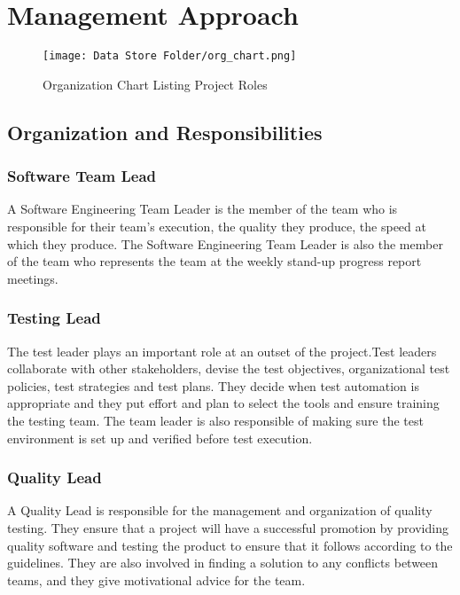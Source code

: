 \documentclass[letterpaper,12pt,oneside,listof=totoc]{scrreprt}
\begin{document}
\chapter{Management Approach} %
\begin{figure}[h!]
\centering
\texttt{[image: Data Store Folder/org\_chart.png]}
\caption{Organization Chart Listing Project Roles}
\end{figure}

\section{Organization and Responsibilities} %
    \subsection{Software Team Lead} 
    A Software Engineering Team Leader is the member of the team who is responsible for their team’s execution, the quality they produce, the speed at which they produce. The Software Engineering Team Leader is also the member of the team who represents the team at the weekly stand-up progress report meetings.
    
    \subsection{Testing Lead} 
    The test leader plays an important role at an outset of the project.Test leaders collaborate with other stakeholders, devise the test objectives, organizational test policies, test strategies and test plans. They decide when test automation is appropriate and they put effort and plan to select the tools and ensure training the testing team. The team leader is also responsible of making sure the test environment is set up and verified before test execution.
    
    \subsection{Quality Lead} A Quality Lead is responsible for the management and organization of quality testing. They ensure that a project will have a successful promotion by providing quality software and testing the product to ensure that it follows according to the guidelines. They are also involved in finding a solution to any conflicts between teams, and they give motivational advice for the team. 
    
\end{document}
